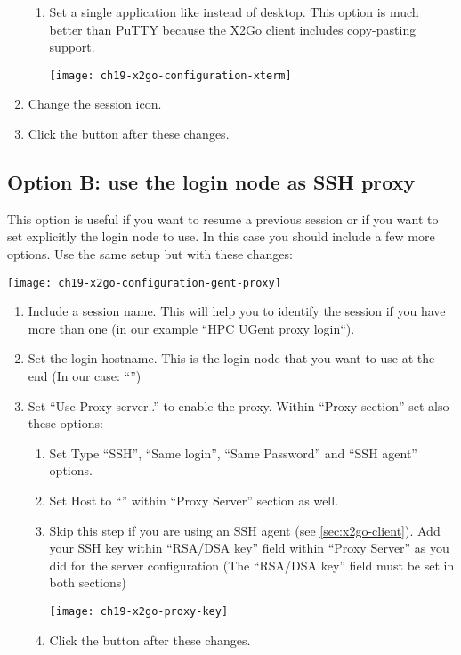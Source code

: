 \begin{enumerate}
    \begin{enumerate}
      \item \strong{[optional]:} Set a single application like  instead of  desktop.
      \ifwindows This option is much better than PuTTY because the X2Go client includes copy-pasting support.\fi
      \begin{center}
        \texttt{[image: ch19-x2go-configuration-xterm]}
      \end{center}
    \end{enumerate}
    \item  \strong{[optional]:} Change the session icon.
    \item  Click the  button after these changes.
\end{enumerate}

\subsection{Option B: use the login node as SSH proxy}
\label{subsec:sessions-x2go-optionb}
This option is useful if you want to resume a previous session or if you want to set explicitly the login node to use.
In this case you should include a few more options. Use the same  setup but with these changes:

\begin{center}
\texttt{[image: ch19-x2go-configuration-gent-proxy]}
\end{center}

\begin{enumerate}
    \item  Include a session name. This will help you to identify 
    the session if you have more than one (in our example ``HPC UGent proxy login``).
    \item  Set the login hostname. This is the login node that you want to use at the end
    (In our case: ``\strong{\emph{\loginhost{}}}'')
    \item  Set ``Use Proxy server..'' to enable the proxy.
    Within ``Proxy section'' set also these options:
    \begin{enumerate}
      \item  Set Type ``SSH'', ``Same login'', ``Same Password'' and ``SSH agent'' options.
      \item  Set Host to ``\strong{\emph{\loginnode}}'' within ``Proxy Server'' section as well.
      \item  Skip this step if you are using an SSH agent (see \autoref{sec:x2go-client}).
      Add your  SSH key within ``RSA/DSA key'' field within ``Proxy Server'' as you
      did for the server configuration (The ``RSA/DSA key'' field must be set in both sections)
      \begin{center}
       \texttt{[image: ch19-x2go-proxy-key]}
      \end{center}
      \item  Click the  button after these changes.
    \end{enumerate}
\end{enumerate}

